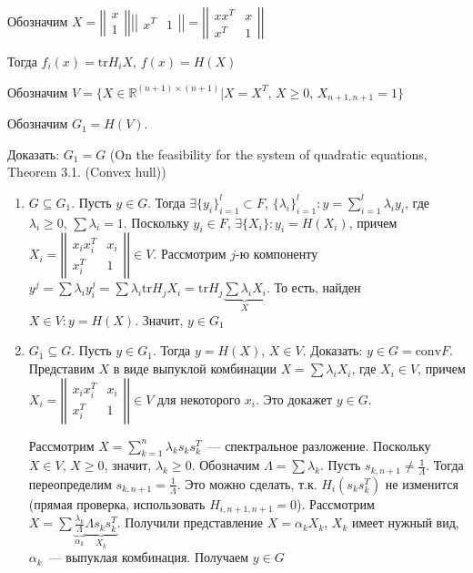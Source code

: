 \documentclass[a4paper]{article}
\begin{document}
Обозначим $X=\left|\left|
\begin{array}{cc}
x\\
1
\end{array}
\right|\right|
\left|\left|
\begin{array}{cc}
x^T & 1
\end{array}
\right|\right|=
\left|\left|
\begin{array}{cc}
xx^T & x\\
x^T & 1
\end{array}
\right|\right|$

Тогда $f_i(x)=\mbox{tr} H_iX$, $f(x)=H(X)$

Обозначим $V=\{X\in\mathbb{R}^{(n+1)\times (n+1)}|X=X^T,\,X\geqslant 0,\,X_{n+1,n+1}=1\}$

Обозначим $G_1=H(V)$.

Доказать: $G_1=G$ (On the feasibility for the system of quadratic equations, Theorem 3.1. (Convex hull))

\begin{enumerate}
	\item $G\subseteq G_1$. Пусть $y\in G$. Тогда $\exists \{y_i\}_{i=1}^l\subset F$, $\{\lambda_i\}_{i=1}^l\colon y=\sum\limits_{i=1}^l\lambda_iy_i$, где $\lambda_i\geqslant 0$, $\sum\lambda_i=1$. Поскольку $y_i\in F$, $\exists \{X_i\}\colon y_i=H(X_i)$, причем $X_i=\left|\left|
	\begin{array}{cc}
	x_ix_i^T & x_i\\
	x_i^T & 1
	\end{array}
	\right|\right|\in V$. Рассмотрим $j$-ю компоненту $y^j=\sum \lambda_i y_i^j=\sum \lambda_i \mbox{tr}H_jX_i=\mbox{tr}H_j\underbrace{\sum\lambda_i X_i}_X$. То есть, найден $X\in V\colon y=H(X)$. Значит, $y\in G_1$
	\item $G_1\subseteq G$. Пусть $y\in G_1$. Тогда $y=H(X)$, $X\in V$. Доказать: $y\in G=\mbox{conv}F$. Представим $X$ в виде выпуклой комбинации $X=\sum\lambda_i X_i$, где $X_i\in V$, причем $X_i=\left|\left|
	\begin{array}{cc}
	x_ix_i^T & x_i\\
	x_i^T & 1
	\end{array}
	\right|\right|\in V$ для некоторого $x_i$. Это докажет $y\in G$.
	
	Рассмотрим $X=\sum\limits_{k=1}^n \lambda_k s_ks_k^T$~--- спектральное разложение. Поскольку $X\in V$, $X\geqslant 0$, значит, $\lambda_k\geqslant 0$.
	Обозначим $\Lambda =\sum\lambda_k$. Пусть $s_{k,n+1}\neq \frac{1}{\Lambda}$. Тогда переопределим $s_{k,n+1}=\frac{1}{\Lambda}$. Это можно сделать, т.к. $H_i(s_ks_k^T)$ не изменится (прямая проверка, использовать $H_{i,n+1,n+1}=0$). Рассмотрим $X=\sum \underbrace{\frac{\lambda_k}{\Lambda}}_{\alpha_k} \underbrace{\Lambda s_ks_k^T}_{X_k}$. Получили представление $X=\alpha_k X_k$, $X_k$ имеет нужный вид, $\alpha_k$~--- выпуклая комбинация. Получаем $y\in G$
	
\end{enumerate}
\end{document}
